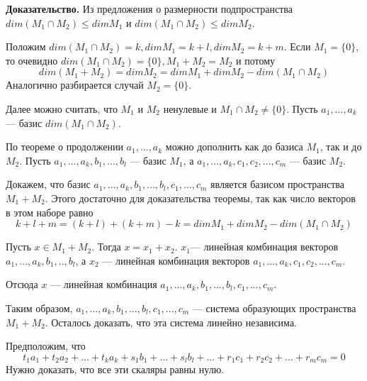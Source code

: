\documentclass[a4paper]{article}
\begin{document}
    \begin{hproof}
        \textbf{Доказательство.} Из предложения о размерности подпространства $dim(M_1 \cap M_2) \leq dim M_1$ и $dim(M_1 \cap M_2) \leq dim M_2$.

        Положим $dim(M_1 \cap M_2) = k, dim M_1 = k + l, dim M_2 = k + m$. Если $M_1 = \{ 0 \}$, то очевидно $dim(M_1 \cap M_2) = \{ 0 \}, M_1 + M_2  = M_2$ и потому
        \begin{equation}
            dim(M_1 + M_2) = dim M_2 = dim M_1 + dim M_2 - dim(M_1 \cap M_2)
        \end{equation}
        Аналогично разбирается случай $M_2 = \{ 0 \} $.

        Далее можно считать, что $M_1$ и $M_2$ ненулевые и $M_1 \cap M_2 \neq \{ 0 \}$. Пусть $a_1, ..., a_k$ --- базис $dim(M_1 \cap M_2)$.

        По теореме о продолжении $a_1, ..., a_k$ можно дополнить как до базиса $M_1$, так и до $M_2$. Пусть $a_1, ..., a_k, b_1, ..., b_l$ --- базис $M_1$, а $a_1, ..., a_k,c_1, c_2, ..., c_m$ --- базис $M_2$.

        Докажем, что базис $a_1, ..., a_k, b_1, ..., b_l, c_1, ..., c_m$ является базисом пространства $M_1 + M_2$. Этого достаточно для доказательства теоремы, так как число векторов в этом наборе равно \begin{equation}
                                                                                                                                                                                                              k + l + m = (k+l) + (k+m) - k = dim M_1 + dim M_2 -dim (M_1 \cap M_2)
        \end{equation}

        Пусть $x \in M_1 + M_2$. Тогда $x = x_1 + x_2$. $x_1 $--- линейная комбинация векторов $a_1, ..., a_k, b_1, .., b_l$, а $x_2$ --- линейная комбинация векторов $a_1, ..., a_k,c_1, c_2, ..., c_m$.

        Отсюда $x$ --- линейная комбинация $a_1, ..., a_k, b_1, ..., b_l, c_1, ..., c_m$.

        Таким образом, $a_1, ..., a_k, b_1, ..., b_l, c_1, ..., c_m$ --- система образующих пространства $M_1 + M_2$. Осталось доказать, что эта система линейно независима.

        Предположим, что
        \begin{equation}
            t_1a_1 + t_2a_2 + ... +t_ka_k + s_1b_1 + ... + s_lb_l + ... + r_1c_1 + r_2c_2 + ... + r_mc_m = 0
        \end{equation}
        Нужно доказать, что все эти скаляры равны нулю.


\end{hproof}
\end{document}
